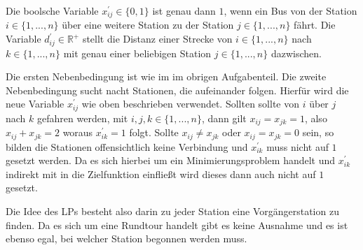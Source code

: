 \documentclass[10pt]{article}
\begin{document}
      Die boolsche Variable $x_{ij}^{\prime} \in \{0,1\}$ ist genau dann $1$,
      wenn ein Bus von der Station $i \in \{1,...,n\}$ über eine weitere Station 
      zu der Station $j\in \{1,...,n\}$ fährt. Die Variable $d_{ij}^{\prime} \in
      \mathbb{R}^{+}$ stellt die Distanz einer Strecke von $i \in \{1,...,n\}$
      nach $k\in\{1,...,n\}$ mit genau einer beliebigen Station $j\in
      \{1,...,n\}$ dazwischen. 

      Die ersten Nebenbedingung ist wie im im obrigen Aufgabenteil. Die zweite
      Nebenbedingung sucht nacht Stationen, die aufeinander folgen. Hierfür wird
      die neue Variable $x_{ij}^{\prime}$ wie oben beschrieben verwendet.
      Sollten sollte von $i$ über $j$ nach $k$ gefahren werden, mit
      $i,j,k\in\{1,...,n\}$, dann gilt $x_{ij}=x_{jk}=1$, also $x_{ij}+x_{jk}=2$
      woraus $x_{ik}^{\prime}=1$ folgt. Sollte $x_{ij} \neq x_{jk}$ oder
      $x_{ij}=x_{jk}=0$ sein, so bilden die Stationen offensichtlich keine
      Verbindung und $x_{ik}^{\prime}$ muss nicht auf $1$ gesetzt werden. Da es
      sich hierbei um ein Minimierungsproblem handelt und $x_{ik}^{\prime}$
      indirekt mit in die Zielfunktion einfließt wird dieses dann auch nicht auf
      $1$ gesetzt.

      Die Idee des LPs besteht also darin zu jeder Station eine Vorgängerstation
      zu finden. Da es sich um eine Rundtour handelt gibt es keine Ausnahme und
      es ist ebenso egal, bei welcher Station begonnen werden muss.

      
\end{document}
